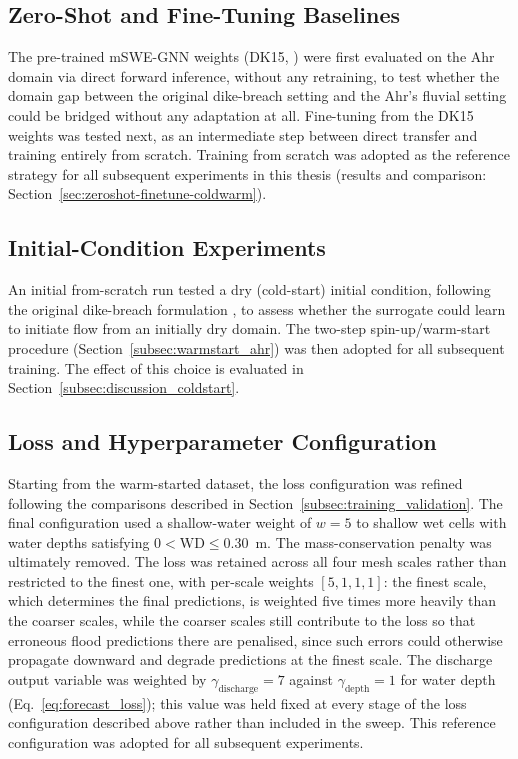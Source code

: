 \documentclass[12pt,a4paper]{report}
\begin{document}
{\subsection{Zero-Shot and Fine-Tuning Baselines}
\label{subsec:zeroshot}

The pre-trained mSWE-GNN weights (DK15, \citealp{bentivoglio2025mswegnn}) were first
evaluated on the Ahr domain via direct forward inference, without any retraining, to
test whether the domain gap between the original dike-breach setting and the Ahr's
fluvial setting could be bridged without any adaptation at all. Fine-tuning from the
DK15 weights was tested next, as an intermediate step between direct transfer and
training entirely from scratch. Training from scratch was adopted as the reference
strategy for all subsequent experiments in this thesis (results and comparison:
Section~\ref{sec:zeroshot-finetune-coldwarm}).

\subsection{Initial-Condition Experiments}
\label{subsec:coldstart}

An initial from-scratch run tested a dry (cold-start) initial condition, following the original dike-breach formulation \citep{bentivoglio2025mswegnn}, to assess whether the surrogate could learn to initiate flow from an initially dry domain. The two-step spin-up/warm-start procedure (Section~\ref{subsec:warmstart_ahr}) was then adopted for all subsequent training. The effect of this choice is evaluated in Section~\ref{subsec:discussion_coldstart}.


\subsection{Loss and Hyperparameter Configuration}
\label{subsec:hyperparam_loss}

Starting from the warm-started dataset, the loss configuration was refined
following the comparisons described in Section~\ref{subsec:training_validation}. The final configuration used a shallow-water weight of $w=5$ to shallow wet cells with
water depths satisfying $0 < \text{WD} \le 0.30$~m. The mass-conservation penalty
was ultimately removed. The loss was retained across all four mesh scales rather
than restricted to the finest one, with per-scale weights $[5,1,1,1]$: the finest
scale, which determines the final predictions, is weighted five times more
heavily than the coarser scales, while the coarser scales still contribute to the
loss so that erroneous flood predictions there are penalised, since such errors
could otherwise propagate downward and degrade predictions at the finest scale.
The discharge output variable was weighted by $\gamma_\text{discharge}=7$ against
$\gamma_\text{depth}=1$ for water depth (Eq.~\ref{eq:forecast_loss}); this value was
held fixed at every stage of the loss configuration described above rather than
included in the sweep. This reference configuration was adopted for all subsequent
experiments.

}
\end{document}
